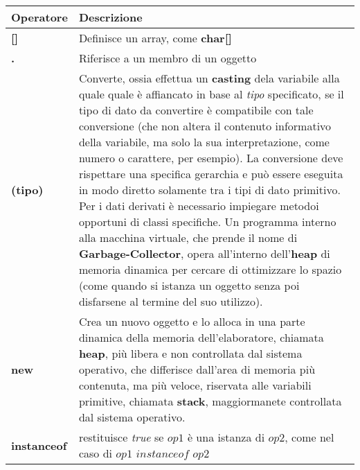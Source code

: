 \documentclass[a4paper]{extarticle}
\begin{document}
\vspace{1em}
\noindent
{}
\begin{tabularx}{\textwidth}{|>{\textwidth}P|P|}
  \hline
  \textbf{Operatore} & \textbf{Descrizione}\\
  \hline
  \textbf{[]} & Definisce un array, come \textbf{char[]}\\
  \hline
  \textbf{.} & Riferisce a un membro di un oggetto\\
  \hline
  \textbf{(tipo)} & \parbox{\linewidth}{\vspace{3mm} Converte, ossia effettua un \textbf{casting} dela variabile alla quale quale è affiancato in base al \emph{tipo} specificato, se il tipo di dato da convertire è compatibile con tale conversione (che non altera il contenuto informativo della variabile, ma solo la sua interpretazione, come numero o carattere, per esempio).
	La conversione deve rispettare una specifica gerarchia e può essere eseguita in modo diretto solamente tra i tipi di dato primitivo. Per i dati derivati è necessario impiegare metodoi opportuni di classi specifiche. Un programma interno alla macchina virtuale, che prende il nome di \textbf{Garbage-Collector}, opera all'interno dell'\textbf{heap} di memoria  dinamica per cercare di ottimizzare lo spazio (come quando si istanza un oggetto senza poi disfarsene al termine del suo utilizzo).\vspace{3mm}}\\
  \hline
  \textbf{new} & \parbox{\linewidth}{\vspace{3mm} Crea un nuovo oggetto e lo alloca in una parte dinamica della memoria dell'elaboratore, chiamata \textbf{heap}, più libera e non controllata dal sistema operativo, che differisce dall'area di memoria più contenuta, ma più veloce, riservata alle variabili primitive, chiamata \textbf{stack}, maggiormanete controllata dal sistema operativo. \vspace{3mm}}\\
  \hline
  \textbf{instanceof} & \parbox{\linewidth}{\vspace{3mm}restituisce \emph{true} se $op1$ è una istanza di $op2$, come nel caso di $op1$ $instanceof$  $op2$\vspace{3mm}}\\
  \hline
\end{tabularx}

\vspace{1em}
\end{document}

